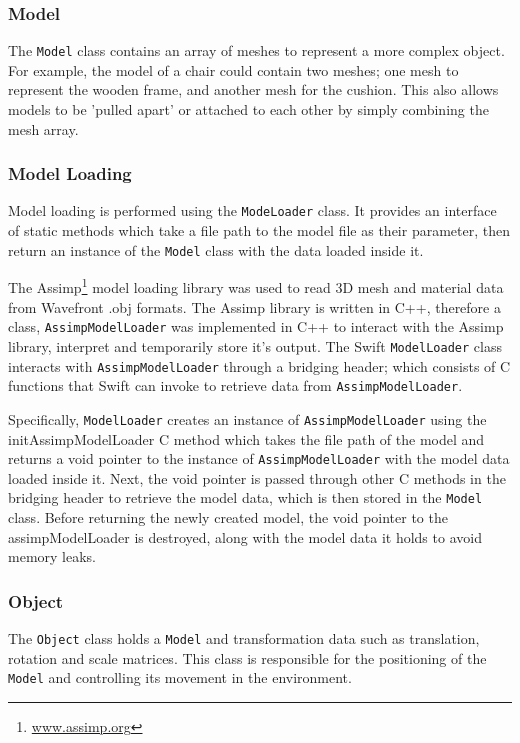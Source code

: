 \documentclass{cmppgr}
\begin{document}
\subsubsection{Model}
 The \texttt{Model} class contains an array of meshes to represent a more complex object. For example, the model of a chair could contain two meshes; one mesh to represent the wooden frame, and another mesh for the cushion. This also allows models to be 'pulled apart' or attached to each other by simply combining the mesh array. 

\subsubsection{Model Loading}
Model loading is performed using the \texttt{ModeLoader} class. It provides an interface of static methods which take a file path to the model file as their parameter, then return an instance of the \texttt{Model} class with the data loaded inside it. 

The Assimp\footnote{\url{www.assimp.org}} model loading library was used to read 3D mesh and material data from Wavefront .obj formats. The Assimp library is written in C++, therefore a class, \texttt{AssimpModelLoader} was implemented in C++ to interact with the Assimp library, interpret and temporarily store it's output. The Swift \texttt{ModelLoader} class interacts with \texttt{AssimpModelLoader} through a bridging header; which consists of C functions that Swift can invoke to retrieve data from \texttt{AssimpModelLoader}. 

Specifically, \texttt{ModelLoader} creates an instance of \texttt{AssimpModelLoader} using the initAssimpModelLoader C method which takes the file path of the model and returns a void pointer to the instance of \texttt{AssimpModelLoader} with the model data loaded inside it. Next, the void pointer is passed through other C methods in the bridging header to retrieve the model data, which is then stored in the \texttt{Model} class. Before returning the newly created model, the void pointer to the assimpModelLoader is destroyed, along with the model data it holds to avoid memory leaks.

\subsubsection{Object}
The \texttt{Object} class holds a \texttt{Model} and transformation data such as translation, rotation and scale matrices. This class is responsible for the positioning of the \texttt{Model} and controlling its movement in the environment.
\end{document}
